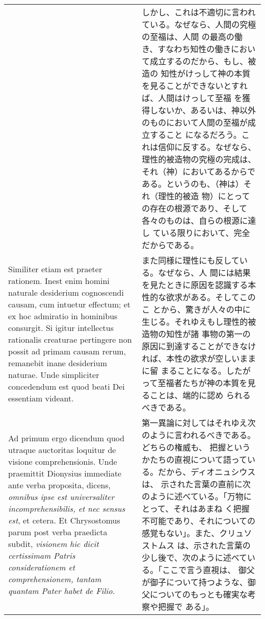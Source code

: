 \documentclass[10pt]{jsarticle} %
\begin{document}
\begin{longtable}{p{21em}p{21em}}
&

しかし、これは不適切に言われている。なぜなら、人間の究極の至福は、人間
の最高の働き、すなわち知性の働きにおいて成立するのだから、もし、被造の
知性がけっして神の本質を見ることができないとすれば、人間はけっして至福
を獲得しないか、あるいは、神以外のものにおいて人間の至福が成立すること
になるだろう。これは信仰に反する。なぜなら、理性的被造物の究極の完成は、
それ（神）においてあるからである。というのも、（神は）それ（理性的被造
 物）にとっての存在の根源であり、そして各々のものは、自らの根源に達し
ている限りにおいて、完全だからである。

\\

Similiter etiam est praeter rationem. Inest enim homini
naturale desiderium cognoscendi causam, cum intuetur effectum; et ex
hoc admiratio in hominibus consurgit. Si igitur intellectus rationalis
creaturae pertingere non possit ad primam causam rerum, remanebit
inane desiderium naturae. Unde simpliciter concedendum est quod beati
Dei essentiam videant.

&

また同様に理性にも反している。なぜなら、人
間には結果を見たときに原因を認識する本性的な欲求がある。そしてこのこ
とから、驚きが人々の中に生じる。それゆえもし理性的被造物の知性が諸
事物の第一の原因に到達することができなければ、本性の欲求が空しいままに留
まることになる。したがって至福者たちが神の本質を見ることは、端的に認め
られるべきである。

\\

{\sc  Ad primum ergo dicendum} quod utraque auctoritas loquitur de
 visione comprehensionis. Unde praemittit Dionysius immediate ante verba
 proposita, dicens, {\it omnibus ipse est universaliter incomprehensibilis,
 et nec sensus est}, et cetera. Et Chrysostomus parum post verba
 praedicta subdit, {\it visionem hic dicit certissimam Patris considerationem
 et comprehensionem, tantam quantam Pater habet de Filio}.

&

第一異論に対してはそれゆえ次のように言われるべきである。どちらの権威も、
把握というかたちの直視について語っている。だから、ディオニュシウスは、
示された言葉の直前に次のように述べている。「万物にとって、それはあまね
く把握不可能であり、それについての感覚もない」。また、クリュソストムス
は、示された言葉の少し後で、次のように述べている。「ここで言う直視は、
御父が御子について持つような、御父についてのもっとも確実な考察や把握で
ある」。

\\


\end{longtable}
\end{document}
